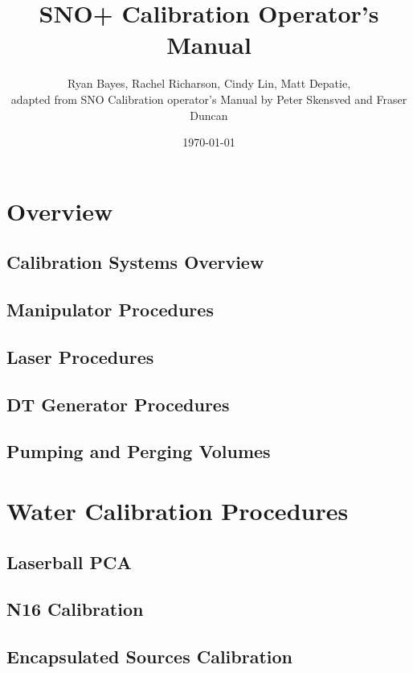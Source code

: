 \documentclass[10pt]{report}
\title{SNO+ Calibration Operator's Manual}
\author{Ryan Bayes, Rachel Richarson, Cindy Lin, Matt Depatie, \\ adapted from SNO Calibration operator's Manual by Peter Skensved and Fraser Duncan}
\date{\today}
\begin{document}
\maketitle
\pagebreak
\part{Overview}


\chapter{Calibration Systems Overview}




\chapter{Manipulator Procedures}

\chapter{Laser Procedures}

\chapter{DT Generator Procedures}


\chapter{Pumping and Perging Volumes}
\part{Water Calibration Procedures}
\chapter{Laserball PCA}

\chapter{N16 Calibration}

\chapter{Encapsulated Sources Calibration}

\end{document}
